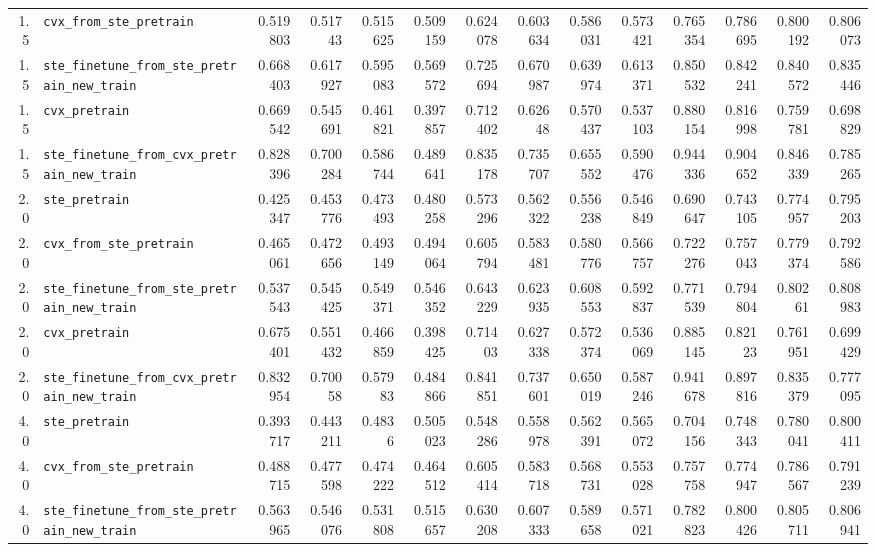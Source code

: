 \begin{longtable}{@{}r l *{12}{r}@{}}
1.5 & \texttt{cvx\_from\_ste\_pretrain} & 0.519803 & 0.51743 & 0.515625 & 0.509159 & 0.624078 & 0.603634 & 0.586031 & 0.573421 & 0.765354 & 0.786695 & 0.800192 & 0.806073 \\
1.5 & \texttt{ste\_finetune\_from\_ste\_pretrain\_new\_train} & 0.668403 & 0.617927 & 0.595083 & 0.569572 & 0.725694 & 0.670987 & 0.639974 & 0.613371 & 0.850532 & 0.842241 & 0.840572 & 0.835446 \\
1.5 & \texttt{cvx\_pretrain} & 0.669542 & 0.545691 & 0.461821 & 0.397857 & 0.712402 & 0.62648 & 0.570437 & 0.537103 & 0.880154 & 0.816998 & 0.759781 & 0.698829 \\
1.5 & \texttt{ste\_finetune\_from\_cvx\_pretrain\_new\_train} & 0.828396 & 0.700284 & 0.586744 & 0.489641 & 0.835178 & 0.735707 & 0.655552 & 0.590476 & 0.944336 & 0.904652 & 0.846339 & 0.785265 \\
2.0 & \texttt{ste\_pretrain} & 0.425347 & 0.453776 & 0.473493 & 0.480258 & 0.573296 & 0.562322 & 0.556238 & 0.546849 & 0.690647 & 0.743105 & 0.774957 & 0.795203 \\
2.0 & \texttt{cvx\_from\_ste\_pretrain} & 0.465061 & 0.472656 & 0.493149 & 0.494064 & 0.605794 & 0.583481 & 0.580776 & 0.566757 & 0.722276 & 0.757043 & 0.779374 & 0.792586 \\
2.0 & \texttt{ste\_finetune\_from\_ste\_pretrain\_new\_train} & 0.537543 & 0.545425 & 0.549371 & 0.546352 & 0.643229 & 0.623935 & 0.608553 & 0.592837 & 0.771539 & 0.794804 & 0.80261 & 0.808983 \\
2.0 & \texttt{cvx\_pretrain} & 0.675401 & 0.551432 & 0.466859 & 0.398425 & 0.71403 & 0.627338 & 0.572374 & 0.536069 & 0.885145 & 0.82123 & 0.761951 & 0.699429 \\
2.0 & \texttt{ste\_finetune\_from\_cvx\_pretrain\_new\_train} & 0.832954 & 0.70058 & 0.57983 & 0.484866 & 0.841851 & 0.737601 & 0.650019 & 0.587246 & 0.941678 & 0.897816 & 0.835379 & 0.777095 \\
4.0 & \texttt{ste\_pretrain} & 0.393717 & 0.443211 & 0.4836 & 0.505023 & 0.548286 & 0.558978 & 0.562391 & 0.565072 & 0.704156 & 0.748343 & 0.780041 & 0.800411 \\
4.0 & \texttt{cvx\_from\_ste\_pretrain} & 0.488715 & 0.477598 & 0.474222 & 0.464512 & 0.605414 & 0.583718 & 0.568731 & 0.553028 & 0.757758 & 0.774947 & 0.786567 & 0.791239 \\
4.0 & \texttt{ste\_finetune\_from\_ste\_pretrain\_new\_train} & 0.563965 & 0.546076 & 0.531808 & 0.515657 & 0.630208 & 0.607333 & 0.589658 & 0.571021 & 0.782823 & 0.800426 & 0.805711 & 0.806941 \\

\end{longtable}
